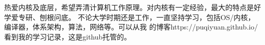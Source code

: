 热爱内核及底层，希望弄清计算机工作原理。对内核有一定经验，最大的特点是好学爱专研、刨根问底。
不论大学时期还是工作，一直坚持学习，包括OS/内核，编译器，体系架构，算法，网络等。可以从我
的博客https://puqiyuan.github.io/看到我的学习记录，这是github托管的。


